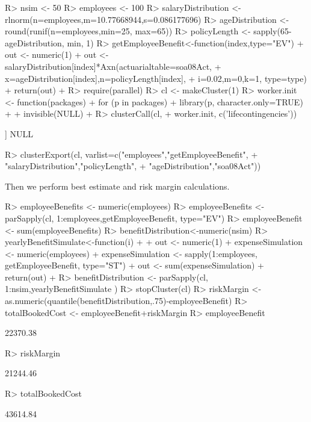 \documentclass[nojss]{jss}
\begin{document}
\begin{Schunk}
\begin{Sinput}
R> nsim <- 50
R> employees <- 100
R> salaryDistribution <- rlnorm(n=employees,m=10.77668944,s=0.086177696)
R> ageDistribution <- round(runif(n=employees,min=25, max=65))
R> policyLength <- sapply(65-ageDistribution, min, 1)
R> getEmployeeBenefit<-function(index,type="EV") {
+  	out <- numeric(1)
+  	out <- salaryDistribution[index]*Axn(actuarialtable=soa08Act, 
+  			x=ageDistribution[index],n=policyLength[index], 
+  			i=0.02,m=0,k=1, type=type)
+  	return(out)
+  }
R> require(parallel)
R> cl <- makeCluster(1) 
R> worker.init <- function(packages) {
+  	for (p in packages) {
+  		library(p, character.only=TRUE)
+  	}
+  	invisible(NULL)
+  }
R> clusterCall(cl, 
+  		worker.init, c('lifecontingencies'))
\end{Sinput}
\begin{Soutput}
[[1]]
NULL
\end{Soutput}
\begin{Sinput}
R> clusterExport(cl, varlist=c("employees","getEmployeeBenefit",
+  				"salaryDistribution","policyLength",
+  				"ageDistribution","soa08Act"))
\end{Sinput}
\end{Schunk}
Then we perform best estimate and risk margin calculations.

\begin{Schunk}
\begin{Sinput}
R> employeeBenefits <- numeric(employees)
R> employeeBenefits <- parSapply(cl, 1:employees,getEmployeeBenefit, type="EV")
R> employeeBenefit <- sum(employeeBenefits)
R> benefitDistribution<-numeric(nsim)
R> yearlyBenefitSimulate<-function(i)
+  {
+  	out <- numeric(1)
+  	expenseSimulation <- numeric(employees)
+  	expenseSimulation <- sapply(1:employees, getEmployeeBenefit, type="ST")
+  	out <- sum(expenseSimulation)
+  	return(out)
+  }
R> benefitDistribution <- parSapply(cl, 1:nsim,yearlyBenefitSimulate )
R> stopCluster(cl)
R> riskMargin <- as.numeric(quantile(benefitDistribution,.75)-employeeBenefit)
R> totalBookedCost <- employeeBenefit+riskMargin
R> employeeBenefit
\end{Sinput}
\begin{Soutput}
[1] 22370.38
\end{Soutput}
\begin{Sinput}
R> riskMargin
\end{Sinput}
\begin{Soutput}
[1] 21244.46
\end{Soutput}
\begin{Sinput}
R> totalBookedCost
\end{Sinput}
\begin{Soutput}
[1] 43614.84
\end{Soutput}
\end{Schunk}
\end{document}
